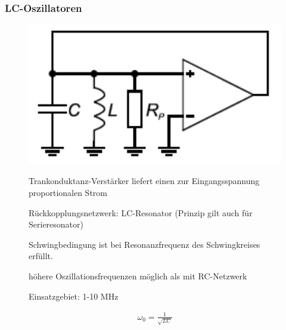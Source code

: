 \subsubsection{LC-Oszillatoren}
\begin{figure}[h!]
	\begin{minipage}{0.3\textwidth} 
	\includegraphics[width=1\textwidth]{images/LC-Oszillator}
	\end{minipage}
	\begin{minipage}{0.6\textwidth}
      \begin{compactitem}
        \item Trankonduktanz-Verstärker liefert einen zur Eingangsspannung proportionalen Strom
        \item Rückkopplungsnetzwerk: LC-Resonator (Prinzip gilt auch für Serieresonator) 
        \item Schwingbedingung ist bei Resonanzfrequenz des Schwingkreises erfüllt.
        \item höhere Oszillationsfrequenzen möglich als mit RC-Netzwerk
        \item Einsatzgebiet: 1-10 MHz
      \end{compactitem}
       \begin{equation*} 
        \begin{split} 
          \omega_0=\frac{1}{\sqrt{LC}}
        \end{split} 
      \end{equation*}
	\end{minipage}
\end{figure}

\FloatBarrier
\newpage
